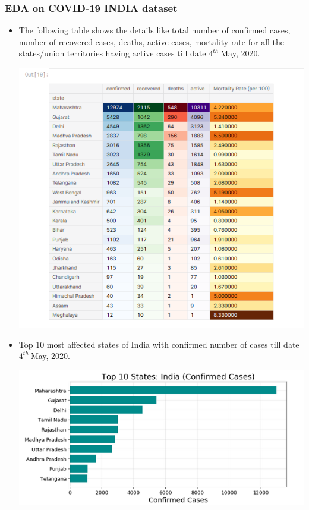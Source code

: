 \documentclass{article}
\begin{document}
\subsubsection*{EDA on COVID-19 INDIA dataset}
\begin{itemize}
\item The following table shows the details like total number of confirmed cases, number of recovered cases, deaths, active cases, mortality rate for all the states/union territories having active cases till date $4^{th}\:$May, 2020.
\begin{center}
\includegraphics[scale=0.75]{corona_10_states}
\end{center}
\item Top 10 most affected states of India with confirmed number of cases till date $4^{th}\:$May, 2020.
\begin{center}
\includegraphics[scale=0.75]{corona_11_topstates}
\end{center}
\end{itemize}
\end{document}
